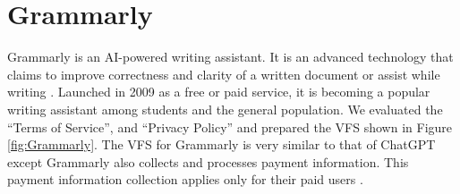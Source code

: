 \documentclass[manuscript,screen,review]{acmart}
\begin{document}
\appendix

\section{Grammarly} \label{appendix:b}

Grammarly is an AI-powered writing assistant. It is an advanced technology that claims to improve correctness and clarity of a written document or assist while writing \cite{grammarly_what_nodate}. Launched in 2009 as a free or paid service, it is becoming a popular writing assistant among students and the general population.  We evaluated the \enquote{Terms of Service}, and \enquote{Privacy Policy} and prepared the VFS shown in Figure \ref{fig:Grammarly}. The VFS for Grammarly is very similar to that of ChatGPT except Grammarly also collects and processes payment information. This payment information collection applies only for their paid users \cite{grammarly_privacy_2023}.
\end{document}
